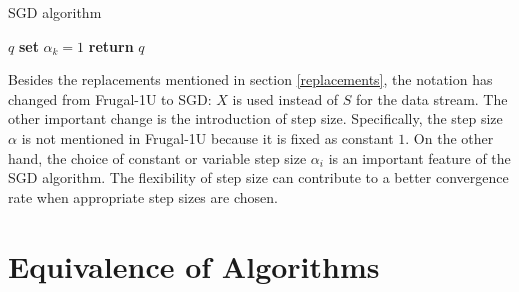 \begin{algorithm}
    \caption{SGD algorithm}\label{alg:SGD}
    \begin{algorithmic}[1]
         $q$                 
                              
                \State \textbf{set} $\alpha_k = 1$  
                                  
                \Else                           {}
                \EndIf
            \EndFor
        \State \textbf{return} $q$              
    \end{algorithmic}
\end{algorithm}
Besides the replacements mentioned in section \ref{replacements}, the notation has changed from Frugal-1U to SGD: 
$X$ is used instead of $S$ for the data stream. The other important change is the introduction of step size. Specifically, the step size $\alpha$ is not mentioned in Frugal-1U because it is fixed as constant $1$. On the other hand, the choice of constant or variable step size $\alpha_i$ is an important feature of the SGD algorithm. The flexibility of step size can contribute to a better convergence rate when appropriate step sizes are chosen.


\section{Equivalence of Algorithms}
\label{sec: algo_equivalence}

